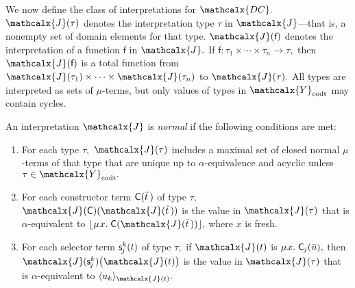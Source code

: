 \documentclass[smallcondensed,draft]{svjour3}
\newcommand\MU{\vvthinspace\mu\vvthinspace}
\newcommand\afterDot{\;} %
\newcommand\const[1]{\textsf{#1}}
\renewcommand{\vec}[1]{\bar #1}
\newcommand{\expand}[2]{\langle \smash{#2} \rangle_{#1}}
\newcommand{\interp}[2]{#1(#2)}
\newcommand{\J}{\mathcalx{J}}
\newcommand{\nf}[1]{\lfloor#1\rfloor}
\newcommand{\aequiv}{\mathrel{=_\alpha}}
\newcommand{\vsim}{\aequiv}
\newcommand{\thD}{\mathcalx{DC}}
\newcommand\Types{\mathcalx{Y}}
\newcommand\Data{\Types_{\mathrm{dt}}}
\newcommand\Codata{\Types_{\mathrm{codt}}}
\newcommand\Nondata{\Types_{\mathrm{ord}}}
\newcommand\vvthinspace{\kern+0.041667em}
\newcommand\negvthinspace{\kern-0.083333em}
\newcommand\negvvthinspace{\kern-0.041667em}
\begin{document}

We now define the class of interpretations for $\thD.$
$\interp{\J}{\tau}$ denotes the interpretation type $\tau$ in $\J$---that is, a
nonempty set of domain elements for that type.
$\interp{\J}{\const{f}}$ denotes the interpretation of a function $\const{f}$ in $\J.$
If $\const{f} : \tau_1 \times \cdots \times \tau_n \to \tau,$
then $\interp{\J}{\const{f}}$ is a total function from $\interp{\J}{\tau_1} \times \cdots \times \interp{\J}{\tau_n}$ to $\interp{\J}{\tau}.$
All types are interpreted as sets of $\mu$-terms, but
only values of types in $\Codata$ may contain cycles.

\begin{definition}
\afterDot%
\label{def:norm-interpretation}%
\rm
An interpretation $\J$ is \emph{normal} if the following conditions are met:
\begin{enumerate}
\item
For each type $\tau,$
$\interp{\J}{\tau}$ includes a maximal set of closed normal $\mu$-terms of that type that are
unique up to $\alpha$-equivalence and acyclic unless $\tau \in \Codata.$\strut

\item
For each constructor term $\vphantom{s^k}\const{C}( \vec t \,)$ of type $\tau,$
$\interp{\J}{\const{C}}( \interp{\J}{\vec t\,} )$ is the value
in $\interp{\J}{\tau}$ that is $\alpha$-equivalent to
$\nf{\MU x.\; \const{C}( \interp{\J}{\vec t\,} )},$ where $x$ is fresh.\strut

\item
For each selector term $\const s^k_{\negvthinspace j}( t )$ of type $\tau,$ %
if $\interp{\J}{t}$ is $\MU x.\; \const{C}_{\negvthinspace j}( \vec u ),$
then $\J\negvvthinspace( \const s^k_{\negvthinspace j} )\bigl( \interp{\J}{t} \bigr)$ is the value
in $\interp{\J}{\tau}$ that is $\alpha$-equivalent to
$\expand{\interp{\J}{t}}{u_k}.$
\end{enumerate}
\end{definition}
\end{document}
